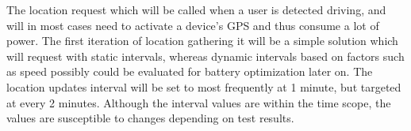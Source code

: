 The location request which will be called when a user is detected driving, and will in most cases need to activate a device's GPS and thus consume a lot of power.
The first iteration of location gathering it will be a simple solution which will request with static intervals, whereas dynamic intervals based on factors such as speed possibly could be evaluated for battery optimization later on.
The location updates interval will be set to most frequently at 1 minute, but targeted at every 2 minutes.
Although the interval values are within the time scope, the values are susceptible to changes depending on test results.

